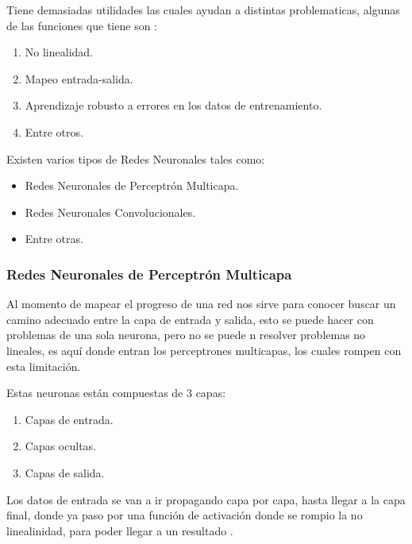         Tiene demasiadas utilidades las cuales ayudan a distintas problematicas, algunas de las funciones que tiene son \cite{liu2015}:

        \begin{enumerate}
            \item No linealidad.
            \item Mapeo entrada-salida.
            \item Aprendizaje robusto a errores en los datos de entrenamiento. 
            \item Entre otros.
        \end{enumerate}

        Existen varios tipos de Redes Neuronales tales como: 
        \begin{itemize}
            \item Redes Neuronales de Perceptr\'on Multicapa.
            \item Redes Neuronales Convolucionales.
            \item Entre otras.
        \end{itemize}
    
        \subsubsection{Redes Neuronales de Perceptr\'on Multicapa}

            Al momento de mapear el progreso de una red nos sirve para conocer buscar un camino adecuado entre la capa de entrada y salida, esto se puede hacer 
            con problemas de una sola neurona, pero no se puede n resolver problemas no lineales, es aqu\'i donde entran los perceptrones
            multicapas, los cuales rompen con esta limitaci\'on.

            Estas neuronas est\'an compuestas de 3 capas:
            \begin{enumerate}
                \item Capas de entrada.
                \item Capas ocultas.
                \item Capas de salida.
            \end{enumerate}

            Los datos de entrada se van a ir propagando capa por capa, hasta llegar a la capa final, donde ya paso
            por una funci\'on de activaci\'on donde se rompio la no linealinidad, para poder llegar a un resultado \cite{liu2015}.

